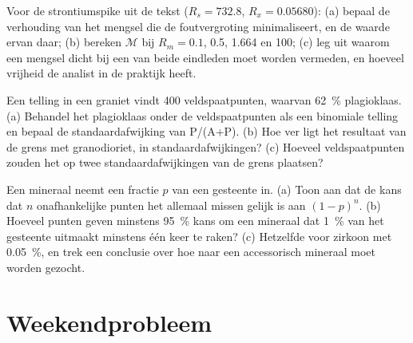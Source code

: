 \begin{exercise}[$\star\star\star$]\label{exo:b2:field-lab-methods-2:10}
Voor de strontiumspike uit de tekst ($R_s = 732.8$, $R_x = 0.05680$): (a) bepaal de verhouding van het mengsel
die de foutvergroting minimaliseert, en de waarde ervan daar; (b) bereken $\mathcal M$ bij
$R_m = 0.1$, 0.5, 1.664 en 100; (c) leg uit waarom een mengsel dicht bij een van beide eindleden moet worden
vermeden, en hoeveel vrijheid de analist in de praktijk heeft.
\end{exercise}

\begin{exercise}[$\star\star\star$]\label{exo:b2:field-lab-methods-2:11}
Een telling in een graniet vindt 400 veldspaatpunten, waarvan \qty{62}{\percent} plagioklaas. (a) Behandel het
plagioklaas onder de veldspaatpunten als een binomiale telling en bepaal de standaardafwijking van
P/(A+P). (b) Hoe ver ligt het resultaat van de grens met granodioriet, in standaardafwijkingen? (c) Hoeveel
veldspaatpunten zouden het op twee standaardafwijkingen van de grens plaatsen?
\end{exercise}

\begin{exercise}[$\star\star\star$]\label{exo:b2:field-lab-methods-2:12}
Een mineraal neemt een fractie $p$ van een gesteente in. (a) Toon aan dat de kans dat $n$ onafhankelijke
punten het allemaal missen gelijk is aan $(1-p)^n$. (b) Hoeveel punten geven minstens \qty{95}{\percent} kans om
een mineraal dat \qty{1}{\percent} van het gesteente uitmaakt minstens één keer te raken? (c) Hetzelfde voor zirkoon met
\qty{0.05}{\percent}, en trek een conclusie over hoe naar een accessorisch mineraal moet worden gezocht.
\end{exercise}

\section*{Weekendprobleem}

